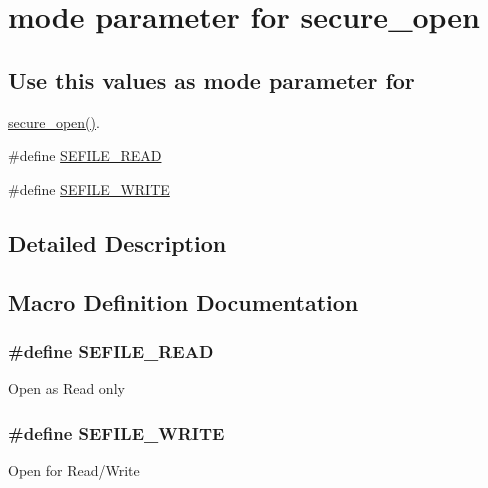 \hypertarget{group___mode___defines}{\section{mode parameter for secure\-\_\-open}
\label{group___mode___defines}
}
\subsection*{Use this values as mode parameter for}
\label{_amgrpd5b5de603422234112c95d28a5b084e8}%
\hyperlink{_s_efile_8c_ae99f8ccb396cbb5685d9e16bb3dbbe98}{secure\-\_\-open()}. \begin{DoxyCompactItemize}
\item 
\#define \hyperlink{group___mode___defines_ga54f7b08eaa281b5cc96f9b38f8cec756}{S\-E\-F\-I\-L\-E\-\_\-\-R\-E\-A\-D}
\item 
\#define \hyperlink{group___mode___defines_ga3402f85400c41104d35136c74566cf67}{S\-E\-F\-I\-L\-E\-\_\-\-W\-R\-I\-T\-E}
\end{DoxyCompactItemize}


\subsection{Detailed Description}


\subsection{Macro Definition Documentation}
\hypertarget{group___mode___defines_ga54f7b08eaa281b5cc96f9b38f8cec756}{
\subsubsection[{S\-E\-F\-I\-L\-E\-\_\-\-R\-E\-A\-D}]{\setlength{\rightskip}{0pt plus 5cm}\#define S\-E\-F\-I\-L\-E\-\_\-\-R\-E\-A\-D}}\label{group___mode___defines_ga54f7b08eaa281b5cc96f9b38f8cec756}
Open as Read only \hypertarget{group___mode___defines_ga3402f85400c41104d35136c74566cf67}{
\subsubsection[{S\-E\-F\-I\-L\-E\-\_\-\-W\-R\-I\-T\-E}]{\setlength{\rightskip}{0pt plus 5cm}\#define S\-E\-F\-I\-L\-E\-\_\-\-W\-R\-I\-T\-E}}\label{group___mode___defines_ga3402f85400c41104d35136c74566cf67}
Open for Read/\-Write 